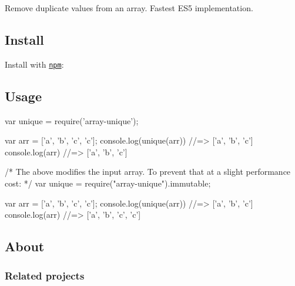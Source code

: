 Remove duplicate values from an array. Fastest E\+S5 implementation.

\subsection*{Install}

Install with \href{https://www.npmjs.com/}{\tt npm}\+:




\subsection*{Usage}


\begin{DoxyCode}
var unique = require('array-unique');

var arr = ['a', 'b', 'c', 'c'];
console.log(unique(arr)) //=> ['a', 'b', 'c']
console.log(arr)         //=> ['a', 'b', 'c']

/* The above modifies the input array. To prevent that at a slight performance cost: */
var unique = require("array-unique").immutable;

var arr = ['a', 'b', 'c', 'c'];
console.log(unique(arr)) //=> ['a', 'b', 'c']
console.log(arr)         //=> ['a', 'b', 'c', 'c']
\end{DoxyCode}


\subsection*{About}

\subsubsection*{Related projects}


